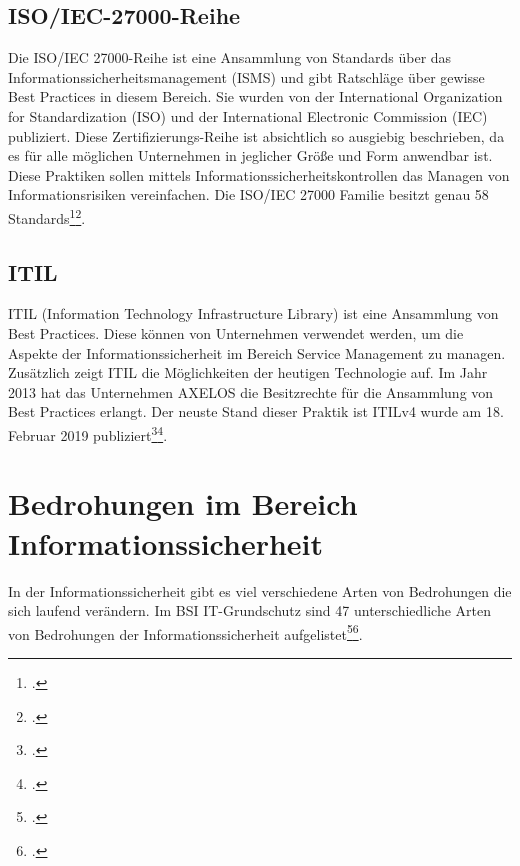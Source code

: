 \subsection{ISO/IEC-27000-Reihe}
Die ISO/IEC 27000-Reihe ist eine Ansammlung von Standards über das Informationssicherheitsmanagement (ISMS) und gibt Ratschläge über gewisse Best Practices in diesem Bereich. Sie wurden von der International Organization for Standardization (ISO) und der International Electronic Commission (IEC) publiziert. 
Diese Zertifizierungs-Reihe ist absichtlich so ausgiebig beschrieben, da es für alle möglichen Unternehmen in jeglicher Größe und Form anwendbar ist.
Diese Praktiken sollen mittels Informationssicherheitskontrollen das Managen von Informationsrisiken vereinfachen. Die ISO/IEC 27000 Familie besitzt genau 58 Standards\footcite{iso-reihe-wiki}\footcite{iso-reihe-gv}.

\subsection{ITIL}
ITIL (Information Technology Infrastructure Library) ist eine Ansammlung von Best Practices. Diese können von Unternehmen verwendet werden, um die Aspekte der Informationssicherheit im Bereich Service Management zu managen. Zusätzlich zeigt ITIL die Möglichkeiten der heutigen Technologie auf. Im Jahr 2013 hat das Unternehmen AXELOS die Besitzrechte für die Ansammlung von Best Practices erlangt.
Der neuste Stand dieser Praktik ist ITILv4 wurde am 18. Februar 2019 publiziert\footcite{Lehrunterlagen-HTL-cloud}\footcite{itil}.


\section{Bedrohungen im Bereich Informationssicherheit}
In der Informationssicherheit gibt es viel verschiedene Arten von Bedrohungen die sich laufend verändern. Im BSI IT-Grundschutz sind 47 unterschiedliche Arten von Bedrohungen der Informationssicherheit aufgelistet\footcite{Lehrunterlagen-HTL-cloud}\footcite{bedrohungen}.


